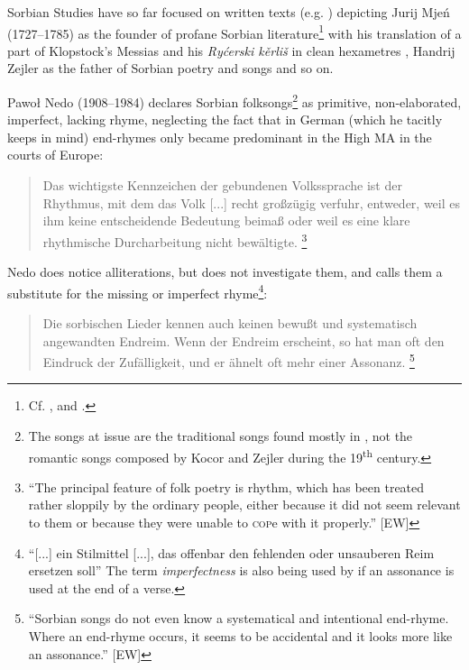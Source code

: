 \documentclass[output=paper,hidelinks]{langscibook}
\begin{document}
Sorbian Studies have so far focused on written texts (e.g. \citealt{Jenč1956}) depicting Jurij Mjeń (1727–1785) as the founder of profane Sorbian literature\footnote{Cf. \citet[130]{Jenč1956}, and \citet[76]{ČermákMaiello2011}.} with his translation of a part of Klopstock’s Messias and his \textit{Ryćerski kěrliš} in clean hexametres \citep{Stone2012}, Handrij Zejler as the father of Sorbian poetry and songs and so on.
 

 
Pawoł Nedo (1908–1984) declares Sorbian folksongs\footnote{The songs at issue are the traditional songs found mostly in \citet{HauptSmoler1843}, not the romantic songs composed by Kocor and Zejler during the 19\textsuperscript{th} century.} as primitive, non-elab\-o\-rated, imperfect, lacking rhyme, neglecting the fact that in German (which he tacitly keeps in mind) end-rhymes only became predominant in the High MA in the courts of Europe:
 

\begin{quote}
Das wichtigste Kennzeichen der gebundenen Volkssprache ist der Rhythmus, mit dem das Volk [...] recht großzügig verfuhr, entweder, weil es ihm keine entscheidende Bedeutung beimaß oder weil es eine klare rhythmische Durcharbeitung nicht bewältigte. \citep[197]{Nedo1966}\footnote{“The principal feature of folk poetry is rhythm, which has been treated rather sloppily by the ordinary people, either because it did not seem relevant to them or because they were unable to \textsc{cop}e with it properly.” [EW]}
\end{quote}

 
Nedo does notice alliterations, but does not investigate them, and calls them a substitute for the missing or imperfect rhyme\footnote{``[...] ein Stilmittel [...], das offenbar den fehlenden oder unsauberen Reim ersetzen soll” \citep[199]{Nedo1966} The term \textit{imperfectness} is also being used by \citet[98]{Kayser1954} if an assonance is used at the end of a verse.}:
 

\begin{quote}
Die sorbischen Lieder kennen auch keinen bewußt und systematisch angewandten Endreim. Wenn der Endreim erscheint, so hat man oft den Eindruck der Zufälligkeit, und er ähnelt oft mehr einer Assonanz. \citep[197]{Nedo1966}\footnote{“Sorbian songs do not even know a systematical and intentional end-rhyme. Where an end-rhyme occurs, it seems to be accidental and it looks more like an assonance.” [EW]}
\end{quote}
\end{document}
